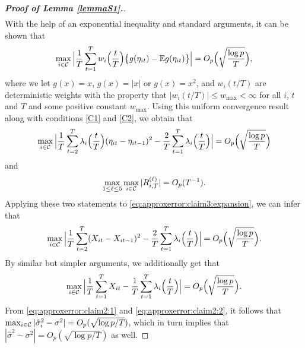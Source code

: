 \documentclass[a4paper,12pt]{article}
\numberwithin{equation}{section}
\begin{document}
\begin{proof}[\textnormal{\textbf{Proof of Lemma \ref{lemmaS1}.}}]
\begin{align*}
\end{align*} 
With the help of an exponential inequality and standard arguments, it can be shown that 
\[ \max_{i \in \mathcal{C}} \Big| \frac{1}{T} \sum_{t=1}^T w_i\Big(\frac{t}{T}\Big) \big\{ g(\eta_{it}) - \mathbb{E} g(\eta_{it}) \big\} \Big| = O_p\Big( \sqrt{\frac{\log p}{T}} \Big), \]
where we let $g(x) = x$, $g(x) = |x|$ or $g(x) = x^2$, and $w_i(t/T)$ are deterministic weights with the property that $|w_i(t/T)| \le w_{\max} < \infty$ for all $i$, $t$ and $T$ and some positive constant $w_{\max}$. Using this uniform convergence result along with conditions \ref{C1} and \ref{C2}, we obtain that 
\[ \max_{i \in \mathcal{C}} \Big| \frac{1}{T} \sum\limits_{t=2}^T \lambda_i\Big(\frac{t}{T}\Big) (\eta_{it} - \eta_{it-1})^2 - \frac{2}{T} \sum\limits_{t=1}^T \lambda_i\Big(\frac{t}{T}\Big) \Big| = O_p\Big( \sqrt{\frac{\log p}{T}} \Big) \]
and 
\[ \max_{1 \le \ell \le 5} \max_{i \in \mathcal{C}} |R_{i,T}^{(\ell)}| = O_p(T^{-1}). \]
Applying these two statements to \eqref{eq:approxerror:claim3:expansion}, we can infer that
\begin{equation}\label{eq:approxerror:claim2:1}
\max_{i \in \mathcal{C}} \Big| \frac{1}{T} \sum\limits_{t=2}^T (X_{it} - X_{it-1})^2 - \frac{2}{T} \sum\limits_{t=1}^T \lambda_i\Big(\frac{t}{T}\Big) \Big| = O_p\Big( \sqrt{\frac{\log p}{T}} \Big). 
\end{equation}
By similar but simpler arguments, we additionally get that 
\begin{equation}\label{eq:approxerror:claim2:2}
\max_{i \in \mathcal{C}} \Big| \frac{1}{T} \sum\limits_{t=1}^T X_{it} - \frac{1}{T} \sum\limits_{t=1}^T \lambda_i\Big(\frac{t}{T}\Big) \Big| = O_p\Big( \sqrt{\frac{\log p}{T}} \Big). 
\end{equation}
From \eqref{eq:approxerror:claim2:1} and \eqref{eq:approxerror:claim2:2}, it follows that $\max_{i \in \mathcal{C}} |\hat{\sigma}_i^2 - \sigma^2| = O_p(\sqrt{\log p / T})$, which in turn implies that $|\hat{\sigma}^2 - \sigma^2| = O_p(\sqrt{\log p / T})$ as well. 
\end{proof} 
\end{document}
